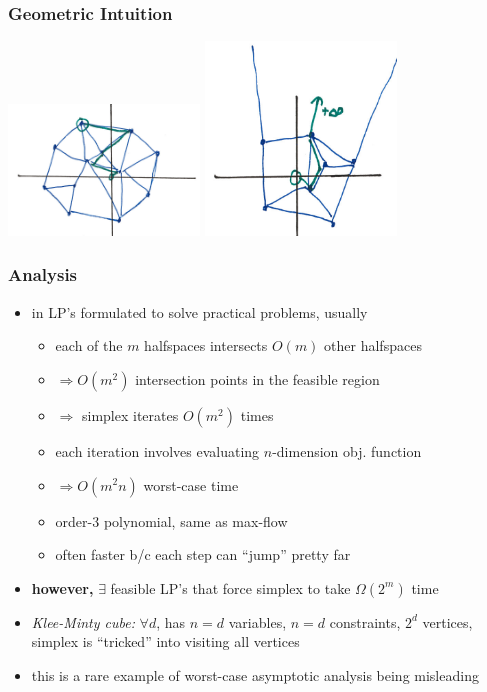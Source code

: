 \documentclass{beamer}
\begin{document}
\begin{frame} \frametitle{Geometric Intuition}
\begin{center}
  \includegraphics[width=2in]{simplex-solution.png}
  \includegraphics[width=2in]{simplex-unbounded.png}
\end{center}
\end{frame}

\begin{frame} \frametitle{Analysis}
  \begin{itemize}
    \item in LP's formulated to solve practical problems, usually
    \begin{itemize}
      \item each of the $m$ halfspaces intersects $O(m)$ other
        halfspaces
      \item $\Rightarrow O(m^2)$ intersection points in the feasible region
      \item $\Rightarrow$ simplex iterates $O(m^2)$ times
      \item each iteration involves evaluating $n$-dimension obj. function
      \item $\Rightarrow O(m^2 n)$ worst-case time
      \item order-3 polynomial, same as max-flow
      \item often faster b/c each step can ``jump'' pretty far
    \end{itemize}
    \item \textbf{however,} $\exists$ feasible LP's that force simplex to take
      $\Omega(2^m)$ time
    \item \emph{Klee-Minty cube:} $\forall d$, has $n=d$ variables, $n=d$ constraints,
      $2^d$ vertices, simplex is ``tricked'' into visiting all vertices
    \item this is a rare example of worst-case asymptotic analysis being misleading
    \end{itemize}
\end{frame}
\end{document}
